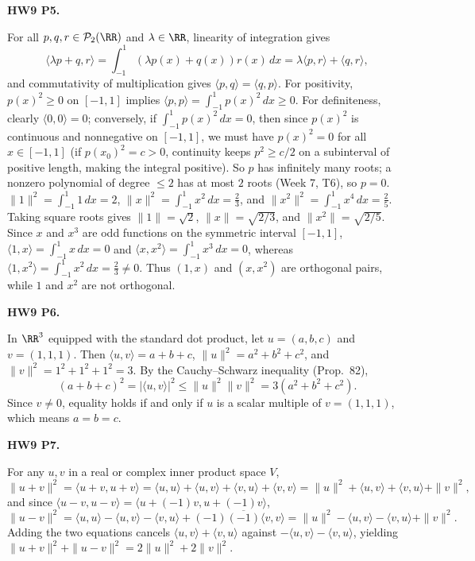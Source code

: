 \documentclass[10pt]{scrartcl}
\newcommand{\ip}[2]{\langle #1,#2\rangle}
\begin{document}
\begin{prob}
\textbf{HW9 P5. }\par 
\begin{enumerate}[(a)]
  \ii {}For all $p,q,r\in\PP_2(\RR)$ and $\lambda\in\RR$, linearity of integration gives
  \[ \ip{\lambda p+q}{r}=\int_{-1}^1(\lambda p(x)+q(x))r(x)\,dx=\lambda\ip pr+\ip qr, \]
  and commutativity of multiplication gives $\ip pq=\ip qp$. For positivity, $p(x)^2\ge 0$ on $[-1,1]$ implies $\ip pp=\int_{-1}^1 p(x)^2\,dx\ge 0$. For definiteness, clearly $\ip 00=0$; conversely, if $\int_{-1}^1 p(x)^2\,dx=0$, then since $p(x)^2$ is continuous and nonnegative on $[-1,1]$, we must have $p(x)^2=0$ for all $x\in[-1,1]$ (if $p(x_0)^2=c>0$, continuity keeps $p^2\ge c/2$ on a subinterval of positive length, making the integral positive). So $p$ has infinitely many roots; a nonzero polynomial of degree $\le2$ has at most $2$ roots (Week 7, T6), so $p=0$.
  \ii $\|1\|^2=\int_{-1}^1 1\,dx=2$, $\|x\|^2=\int_{-1}^1 x^2\,dx=\frac{2}{3}$, and $\|x^2\|^2=\int_{-1}^1 x^4\,dx=\frac{2}{5}$. Taking square roots gives $\|1\|=\sqrt{2}$, $\|x\|=\sqrt{2/3}$, and $\|x^2\|=\sqrt{2/5}$.
  \ii Since $x$ and $x^3$ are odd functions on the symmetric interval $[-1,1]$, $\ip 1x=\int_{-1}^1 x\,dx=0$ and $\ip x{x^2}=\int_{-1}^1 x^3\,dx=0$, whereas $\ip 1{x^2}=\int_{-1}^1 x^2\,dx=\frac{2}{3}\ne 0$. Thus $(1,x)$ and $(x,x^2)$ are orthogonal pairs, while $1$ and $x^2$ are not orthogonal.
\end{enumerate}
\end{prob}

\begin{prob}
\textbf{HW9 P6. }\par 
{}In $\RR^3$ equipped with the standard dot product, let $u=(a,b,c)$ and $v=(1,1,1)$. Then $\ip uv=a+b+c$, $\|u\|^2=a^2+b^2+c^2$, and $\|v\|^2=1^2+1^2+1^2=3$. By the Cauchy--Schwarz inequality (Prop.~82),
\[
  (a+b+c)^2 = |\ip uv|^2 \le \|u\|^2\|v\|^2 = 3(a^2+b^2+c^2).
\]
Since $v\ne 0$, equality holds if and only if $u$ is a scalar multiple of $v=(1,1,1)$, which means $a=b=c$.
\end{prob}

\begin{prob}
\textbf{HW9 P7. }\par 
{}For any $u,v$ in a real or complex inner product space $V$,
\[
  \|u+v\|^2 = \ip{u+v}{u+v} = \ip uu + \ip uv + \ip vu + \ip vv = \|u\|^2 + \ip uv + \ip vu + \|v\|^2,
\]
and since $\ip{u-v}{u-v}=\ip{u+(-1)v}{u+(-1)v}$,
\[
  \|u-v\|^2 = \ip uu - \ip uv - \ip vu + (-1)\overline{(-1)}\ip vv = \|u\|^2 - \ip uv - \ip vu + \|v\|^2.
\]
Adding the two equations cancels $\ip uv+\ip vu$ against $-\ip uv-\ip vu$, yielding $\|u+v\|^2+\|u-v\|^2=2\|u\|^2+2\|v\|^2$.
\end{prob}
\end{document}
